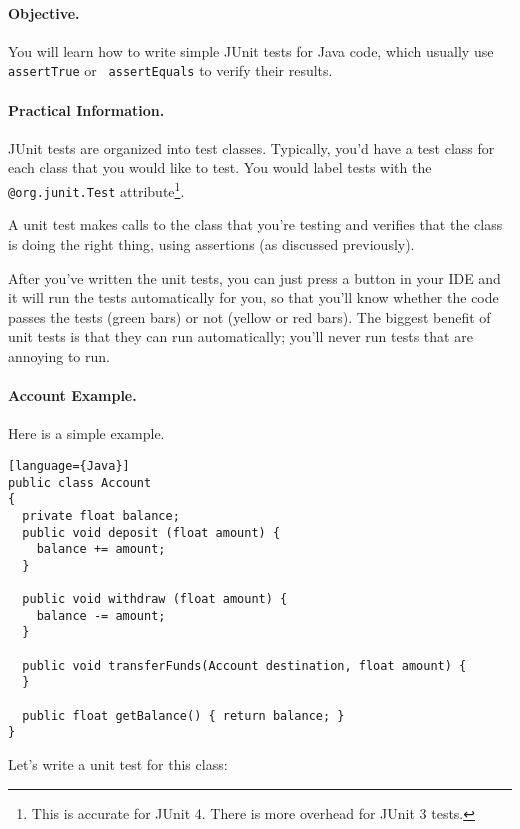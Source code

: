 \paragraph{Objective.} You will learn how to write simple JUnit 
tests for Java code, which usually use {\tt assertTrue} or {\tt
  assertEquals} to verify their results.

\paragraph{Practical Information.} JUnit tests are organized into 
test classes. Typically, you'd have a test class for each class that
you would like to test. You would label tests with the {\tt @org.junit.Test} attribute\footnote{This is
accurate for JUnit 4. There is more overhead for JUnit 3 tests.}.

A unit test makes calls to the class that you're testing and verifies
that the class is doing the right thing, using assertions (as
discussed previously).

After you've written the unit tests, you can just press a button in
your IDE and it will run the tests automatically for you, so that
you'll know whether the code passes the tests (green bars) or not
(yellow or red bars). The biggest benefit of unit tests is that they
can run automatically; you'll never run tests that are annoying to
run.

\paragraph{Account Example.} Here is a simple example.

\begin{verbatim}[language={Java}]
public class Account
{
  private float balance;
  public void deposit (float amount) {
    balance += amount;
  }

  public void withdraw (float amount) {
    balance -= amount;
  }

  public void transferFunds(Account destination, float amount) {
  }

  public float getBalance() { return balance; }
}
\end{verbatim}

Let's write a unit test for this class:

